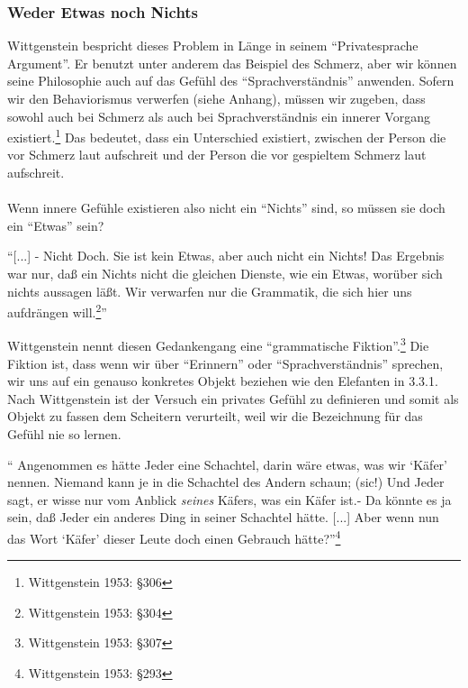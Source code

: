 \documentclass[a4paper,10pt]{article}
\begin{document}
\subsubsection{Weder Etwas noch Nichts}
Wittgenstein bespricht dieses Problem in Länge in seinem \enquote{Privatesprache Argument}. Er benutzt unter anderem das Beispiel des Schmerz, aber wir können seine Philosophie auch auf das Gefühl des \enquote{Sprachverständnis} anwenden. Sofern wir den Behaviorismus verwerfen (siehe Anhang), müssen wir zugeben, dass sowohl auch bei Schmerz als auch bei Sprachverständnis ein innerer Vorgang existiert.\footnote{Wittgenstein 1953: §306} Das bedeutet, dass ein Unterschied existiert, zwischen der Person die vor Schmerz laut aufschreit und der Person die vor gespieltem Schmerz laut aufschreit. \\
\\
Wenn innere Gefühle existieren also nicht ein \enquote{Nichts} sind, so müssen sie doch ein \enquote{Etwas} sein?

\begin{displayquote}
\enquote{[...] - Nicht Doch. Sie ist kein Etwas, aber auch nicht ein Nichts! Das Ergebnis war nur, daß ein Nichts nicht die gleichen Dienste, wie ein Etwas, worüber sich nichts aussagen läßt. Wir verwarfen nur die Grammatik, die sich hier uns aufdrängen will.\footnote{Wittgenstein 1953: §304}}
\end{displayquote}
Wittgenstein nennt diesen Gedankengang eine \enquote{grammatische Fiktion}.\footnote{Wittgenstein 1953: §307} Die Fiktion ist, dass wenn wir über \enquote{Erinnern} oder \enquote{Sprachverständnis} sprechen, wir uns auf ein genauso konkretes Objekt beziehen wie den Elefanten in 3.3.1. Nach Wittgenstein ist der Versuch ein privates Gefühl zu definieren und somit als Objekt zu fassen dem Scheitern verurteilt, weil wir die Bezeichnung für das Gefühl nie so lernen.

\begin{displayquote}
\enquote{
Angenommen es hätte Jeder eine Schachtel, darin wäre etwas, was wir \enquote{Käfer} nennen. Niemand kann je in die Schachtel des Andern schaun; (sic!) Und Jeder sagt, er wisse nur vom Anblick \textit{seines} Käfers, was ein Käfer ist.- Da könnte es ja sein, daß Jeder ein anderes Ding in seiner Schachtel hätte. [...] Aber wenn nun das Wort \enquote{Käfer} dieser Leute doch einen Gebrauch hätte?}\footnote{Wittgenstein 1953: §293}
\end{displayquote}
\end{document}
